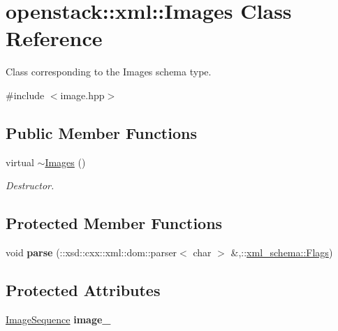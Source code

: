 \hypertarget{classopenstack_1_1xml_1_1Images}{
\section{openstack::xml::Images Class Reference}
\label{classopenstack_1_1xml_1_1Images}
}


Class corresponding to the Images schema type.  




{\ttfamily \#include $<$image.hpp$>$}

\subsection*{Public Member Functions}
\begin{DoxyCompactItemize}
\item 
\hypertarget{classopenstack_1_1xml_1_1Images_aa4fbd7700d70c8bc304a078ec8d1ecd2}{
virtual \hyperlink{classopenstack_1_1xml_1_1Images_aa4fbd7700d70c8bc304a078ec8d1ecd2}{$\sim$Images} ()}
\label{classopenstack_1_1xml_1_1Images_aa4fbd7700d70c8bc304a078ec8d1ecd2}

\begin{DoxyCompactList}\small\item\em Destructor. \item\end{DoxyCompactList}\end{DoxyCompactItemize}
\subsection*{Protected Member Functions}
\begin{DoxyCompactItemize}
\item 
\hypertarget{classopenstack_1_1xml_1_1Images_a8d96ca9bce8c35a54ef7d0d449244532}{
void {\bfseries parse} (::xsd::cxx::xml::dom::parser$<$ char $>$ \&,::\hyperlink{namespacexml__schema_affb4c227cbd9aa7453dd1dc5a1401943}{xml\_\-schema::Flags})}
\label{classopenstack_1_1xml_1_1Images_a8d96ca9bce8c35a54ef7d0d449244532}

\end{DoxyCompactItemize}
\subsection*{Protected Attributes}
\begin{DoxyCompactItemize}
\item 
\hypertarget{classopenstack_1_1xml_1_1Images_ad237e07d62927f00cd20a6a89404388c}{
\hyperlink{classopenstack_1_1xml_1_1Images_af5703f22e0842ce76fb1afc5b52fd2cd}{ImageSequence} {\bfseries image\_\-}}
\label{classopenstack_1_1xml_1_1Images_ad237e07d62927f00cd20a6a89404388c}

\end{DoxyCompactItemize}
